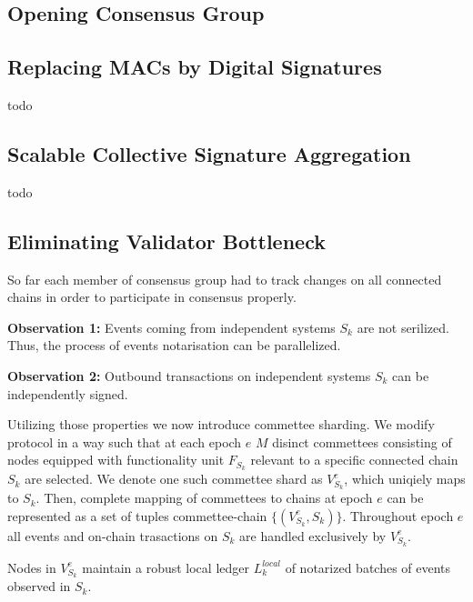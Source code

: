 \subsection{Opening Consensus Group}\label{subsec:opening-consensus-group}



\subsection{Replacing MACs by Digital Signatures}\label{subsec:replacing-macs-by-digital-signatures}

todo

\subsection{Scalable Collective Signature Aggregation}\label{subsec:scalable-collective-signature-aggregation}

todo

\subsection{Eliminating Validator Bottleneck}\label{subsec:eliminating-validator-bottleneck}

So far each member of consensus group had to track changes on all connected chains in order to participate in consensus properly.

\textbf{Observation 1:} Events coming from independent systems $S_k$ are not serilized.
Thus, the process of events notarisation can be parallelized.

\textbf{Observation 2:} Outbound transactions on independent systems $S_k$ can be independently signed.

Utilizing those properties we now introduce commettee sharding.
We modify protocol in a way such that at each epoch $e$ $M$ disinct commettees consisting of nodes equipped with functionality unit $F_{S_k}$ relevant to a specific connected chain $S_k$ are selected.
We denote one such commettee shard as $V^{e}_{S_k}$, which uniqiely maps to $S_k$.
Then, complete mapping of commettees to chains at epoch $e$ can be represented as a set of tuples commettee-chain $\{(V^{e}_{S_k}, S_k)\}$.
Throughout epoch $e$ all events and on-chain trasactions on $S_k$ are handled exclusively by $V^{e}_{S_k}$.

Nodes in $V^{e}_{S_k}$ maintain a robust local ledger $L^{local}_k$ of notarized batches of events observed in $S_k$.

